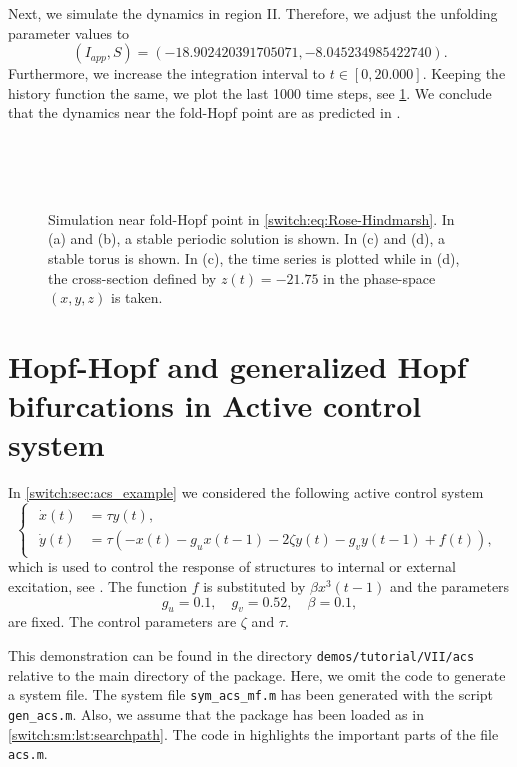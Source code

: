 Next, we simulate the dynamics in region II. Therefore, we adjust the unfolding parameter values to 
\[
(I_{app},S)=(-18.902420391705071,-8.045234985422740).
\]
Furthermore, we increase the integration interval to $t\in[0,20.000]$. Keeping the history function the same, we plot the last 1000 time steps, see \cref{switch:fig:Rose-Hindmarsh-simulation}. We conclude that the dynamics near the fold-Hopf point are as predicted in \cite{Kuznetsov2004}.
%
\begin{figure}[!th]
\centering
{} \\
 \\[0.6cm]
 \\
\caption{Simulation near fold-Hopf point in \cref{switch:eq:Rose-Hindmarsh}. In \textup{(a)} and \textup{(b)}, a stable periodic solution is shown. In \textup{(c)} and \textup{(d)}, a stable torus is shown. In \textup{(c)}, the time series is plotted while in \textup{(d)}, the cross-section defined by $z(t)=-21.75$ in the phase-space $(x,y,z)$ is taken.}
\label{switch:fig:Rose-Hindmarsh-simulation}
\end{figure}

\section{Hopf-Hopf and generalized Hopf bifurcations in Active control system}
In \cref{switch:sec:acs_example} we considered the following active control system
\begin{equation}
\begin{cases}
\begin{aligned}
\dot{x}(t)&=\tau y(t),\\
\dot{y}(t)&=\tau\left(-x(t)-g_{u}x(t-1)-2\zeta y(t)-g_{v}y(t-1)+f(t)\right),
\end{aligned}
\end{cases}\label{switch:sm:eq:acs}
\end{equation}
which  is used to control the response of structures to internal or external excitation, see \cite{Peng2013}. The function $f$ is substituted by $\beta x^{3}(t-1)$ and the parameters
\[
g_{u}=0.1,\quad g_{v}=0.52,\quad\beta=0.1,
\]
are fixed. The control parameters are $\zeta$ and $\tau$. 

\begin{remark}
	This demonstration can be found in the directory \lstinline|demos/tutorial/VII/acs| relative to the main directory of the \DDEBIFTOOL package. Here, we omit the code to generate a system file. The system file \lstinline|sym_acs_mf.m| has been generated with the script \lstinline|gen_acs.m|. Also, we assume that the \DDEBIFTOOL package has been loaded as in \cref{switch:sm:lst:searchpath}.
	The code in  highlights the important parts of the file \lstinline|acs.m|.
\end{remark}

